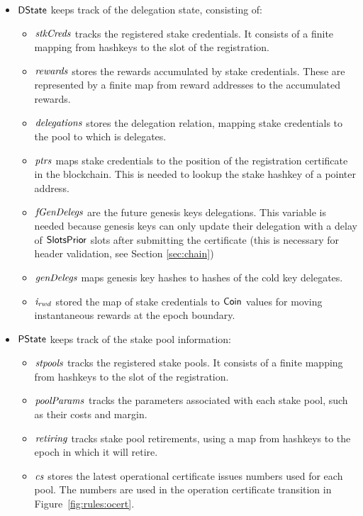 \begin{itemize}
  \item $\mathsf{DState}$ keeps track of the delegation state, consisting of:
    \begin{itemize}
    \item $\mathit{stkCreds}$ tracks the registered stake credentials. It consists
      of a finite mapping from hashkeys to the slot of the registration.
    \item $\mathit{rewards}$ stores the rewards accumulated by stake credentials.
      These are represented by a finite map from reward addresses to the
      accumulated rewards.
    \item $\mathit{delegations}$ stores the delegation relation, mapping stake
      credentials to the pool to which is delegates.
    \item $\mathit{ptrs}$ maps stake credentials to the position of the
      registration certificate in the blockchain. This is needed to lookup the
      stake hashkey of a pointer address.
      \item $\mathit{fGenDelegs}$ are the future genesis keys delegations. This variable
      is needed because genesis keys can only update their delegation with a
      delay of $\mathsf{SlotsPrior}$ slots after submitting the certificate (this is
      necessary for header validation, see Section \ref{sec:chain})
      \item $\mathit{genDelegs}$ maps genesis key hashes to hashes of the cold key
        delegates.
      \item $\mathit{i_{rwd}}$ stored the map of stake credentials to $\mathsf{Coin}$
        values for moving instantaneous rewards at the epoch boundary.
    \end{itemize}
  \item $\mathsf{PState}$ keeps track of the stake pool information:
    \begin{itemize}
      \item $\mathit{stpools}$ tracks the registered stake pools. It consists of a finite
        mapping from hashkeys to the slot of the registration.
      \item $\mathit{poolParams}$ tracks the parameters associated with each stake pool, such as
        their costs and margin.
      \item $\mathit{retiring}$ tracks stake pool retirements, using a map from hashkeys to
        the epoch in which it will retire.
      \item $\mathit{cs}$ stores the latest operational certificate issues numbers used for each pool.
        The numbers are used in the operation certificate transition
        in Figure~\ref{fig:rules:ocert}.
    \end{itemize}
\end{itemize}

